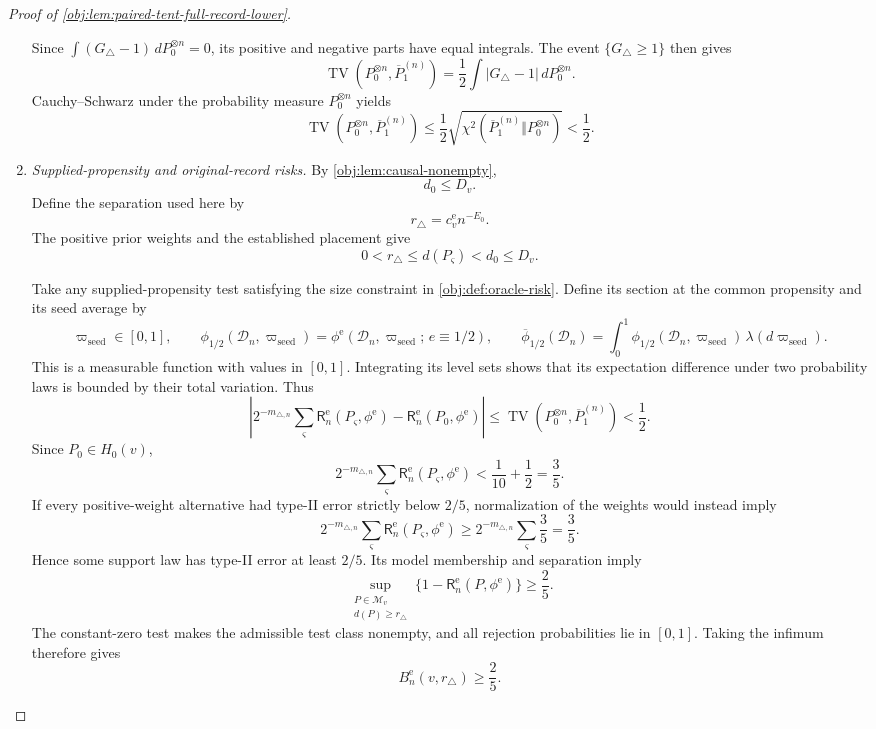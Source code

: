 \documentclass[11pt]{article}
\begin{document}
\begin{proof}[Proof of \cref{obj:lem:paired-tent-full-record-lower}]
\begin{enumerate}
Since \(\int(G_\triangle-1)\,dP_0^{\otimes n}=0\), its positive and negative
parts have equal integrals. The event \(\{G_\triangle\ge1\}\) then gives
\[
\operatorname{TV}(P_0^{\otimes n},\overline P_1^{(n)})
=
\frac12\int|G_\triangle-1|\,dP_0^{\otimes n}.
\]
Cauchy--Schwarz under the probability measure \(P_0^{\otimes n}\) yields
\[
\operatorname{TV}(P_0^{\otimes n},\overline P_1^{(n)})
\le
\frac12
\sqrt{\chi^2(\overline P_1^{(n)}\Vert P_0^{\otimes n})}
<\frac12.
\]

\item \emph{Supplied-propensity and original-record risks.}
By \cref{obj:lem:causal-nonempty},
\[
d_0\le D_v.
\]
Define the separation used here by
\[
r_\triangle=c_v^{\mathrm e}n^{-E_0}.
\]
The positive prior weights and the established placement give
\[
0<r_\triangle\le d(P_\varsigma)<d_0\le D_v.
\]

Take any supplied-propensity test satisfying the size constraint in
\cref{obj:def:oracle-risk}. Define its section at the common propensity and
its seed average by
\[
\varpi_{\mathrm{seed}}\in[0,1],
\qquad
\phi_{1/2}(\mathcal D_n,\varpi_{\mathrm{seed}})
=
\phi^{\mathrm e}(\mathcal D_n,\varpi_{\mathrm{seed}};\,e\equiv1/2),
\qquad
\overline\phi_{1/2}(\mathcal D_n)
=
\int_0^1\phi_{1/2}(\mathcal D_n,\varpi_{\mathrm{seed}})\,\lambda(d\varpi_{\mathrm{seed}}).
\]
This is a measurable function with values in \([0,1]\). Integrating its level
sets shows that its expectation difference under two probability laws is
bounded by their total variation. Thus
\[
\left|
2^{-m_{\triangle,n}}\sum_\varsigma
\mathsf R_n^{\mathrm e}(P_\varsigma,\phi^{\mathrm e})
-
\mathsf R_n^{\mathrm e}(P_0,\phi^{\mathrm e})
\right|
\le
\operatorname{TV}(P_0^{\otimes n},\overline P_1^{(n)})
<\frac12.
\]
Since \(P_0\in H_0(v)\),
\[
2^{-m_{\triangle,n}}\sum_\varsigma
\mathsf R_n^{\mathrm e}(P_\varsigma,\phi^{\mathrm e})
<\frac1{10}+\frac12=\frac35.
\]
If every positive-weight alternative had type-II error strictly below
\(2/5\), normalization of the weights would instead imply
\[
2^{-m_{\triangle,n}}\sum_\varsigma
\mathsf R_n^{\mathrm e}(P_\varsigma,\phi^{\mathrm e})
\ge
2^{-m_{\triangle,n}}\sum_\varsigma\frac35
=\frac35.
\]
Hence some support law has type-II error at least \(2/5\). Its model
membership and separation imply
\[
\sup_{\substack{P\in\mathcal M_v\\d(P)\ge r_\triangle}}
\bigl\{1-\mathsf R_n^{\mathrm e}(P,\phi^{\mathrm e})\bigr\}
\ge\frac25.
\]
The constant-zero test makes the admissible test class nonempty, and all
rejection probabilities lie in \([0,1]\). Taking the infimum therefore gives
\[
B_n^{\mathrm e}(v,r_\triangle)\ge\frac25.
\]


\end{enumerate}
\end{proof}
\end{document}
